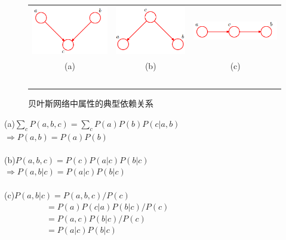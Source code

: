 \begin{frame}
	\begin{figure}
		\centering
		\begin{tabular}{ccc}
			\includegraphics[width=0.28\linewidth]{pic/head2head.png} &
			\includegraphics[width=0.28\linewidth]{pic/tail2tail.png} &
			\includegraphics[width=0.28\linewidth]{pic/head2tail.png}\\
			(a) & (b) & (c) \\
			~\\
		\end{tabular}
		\caption{贝叶斯网络中属性的典型依赖关系}
		\label{0-004}
		\vspace{-0.5em}
	\end{figure}
\end{frame}

\begin{frame}
	(a)$\sum_{c}P(a,b,c)=\sum_{c}P(a)P(b)P(c|a,b)$ \\ $\Rightarrow P(a,b)=P(a)P(b)$
	~\\
	~\\
	(b)$P(a,b,c)=P(c)P(a|c)P(b|c)$ \\ $\Rightarrow P(a,b|c)=P(a|c)P(b|c)$
	~\\
	~\\
	(c)$P(a,b|c)=P(a,b,c)/P(c)$ \\ $\qquad\qquad\quad=P(a)P(c|a)P(b|c)/P(c)$ \\ $\qquad\qquad\quad=P(a,c)P(b|c)/P(c)$ \\ $\qquad\qquad\quad=P(a|c)P(b|c)$
\end{frame}

